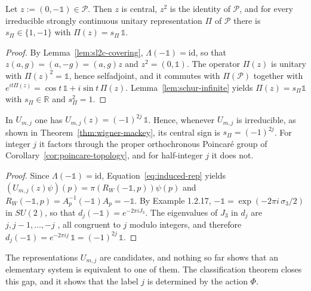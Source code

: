 \begin{proposition}\label{prop:central-sign}
	Let $z:=(0,-\mathbb{1})\in\mathcal{P}$. Then $z$ is central, $z^2$ is the identity of $\mathcal{P}$, and for every irreducible strongly continuous unitary representation $\Pi$ of $\mathcal{P}$ there is $s_\Pi\in\{1,-1\}$ with $\Pi(z)=s_\Pi\,\mathbb{1}$.
\end{proposition}

\begin{proof}
	By Lemma~\ref{lem:sl2c-covering}, $\Lambda(-\mathbb{1})=\mathrm{id}$, so that $z(a,g)=(a,-g)=(a,g)z$ and $z^2=(0,\mathbb{1})$. The operator $\Pi(z)$ is unitary with $\Pi(z)^2=\mathbb{1}$, hence selfadjoint, and it commutes with $\Pi(\mathcal{P})$ together with $e^{it\Pi(z)}=\cos t\,\mathbb{1}+i\sin t\,\Pi(z)$. Lemma~\ref{lem:schur-infinite} yields $\Pi(z)=s_\Pi\mathbb{1}$ with $s_\Pi\in\mathbb{R}$ and $s_\Pi^2=1$.
\end{proof}

\begin{corollary}\label{cor:central-sign-spin}
	In $U_{m,j}$ one has $U_{m,j}(z)=(-1)^{2j}\,\mathbb{1}$. Hence, whenever $U_{m,j}$ is irreducible, as shown in Theorem~\ref{thm:wigner-mackey}, its central sign is $s_\Pi=(-1)^{2j}$. For integer $j$ it factors through the proper orthochronous Poincar\'e group of Corollary~\ref{cor:poincare-topology}, and for half-integer $j$ it does not.
\end{corollary}

\begin{proof}
	Since $\Lambda(-\mathbb{1})=\mathrm{id}$, Equation~\eqref{eq:induced-rep} yields $(U_{m,j}(z)\psi)(p)=\pi(R_W(-\mathbb{1},p))\psi(p)$ and $R_W(-\mathbb{1},p)=A_p^{-1}(-\mathbb{1})A_p=-\mathbb{1}$. By Example 1.2.17, $-\mathbb{1}=\exp(-2\pi i\,\sigma_3/2)$ in $SU(2)$, so that $d_j(-\mathbb{1})=e^{-2\pi iJ_3}$. The eigenvalues of $J_3$ in $d_j$ are $j,j-1,\dots,-j$ \cite[TODO-location]{TODO-Hal03}, all congruent to $j$ modulo integers, and therefore $d_j(-\mathbb{1})=e^{-2\pi ij}\,\mathbb{1}=(-1)^{2j}\,\mathbb{1}$.
\end{proof}

\noindent The representations $U_{m,j}$ are candidates, and nothing so far shows that an elementary system is equivalent to one of them. The classification theorem closes this gap, and it shows that the label $j$ is determined by the action $\Phi$.

